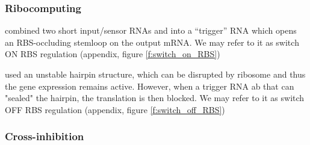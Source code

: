 \documentclass[12pt,notitlepage]{article}
\newcommand{\hh}[1]{{\color{Purple}#1}}
\begin{document}
\subsubsection*{Ribocomputing}

\citet[\href{https://www.nature.com/articles/nature23271/figures/2}{Fig.~2e}]{GreenETAL2017}
combined
two short input/sensor RNAs
 and 
into a ``trigger'' RNA
which opens an RBS-occluding stemloop
on the output mRNA. \hh{We may refer to it as switch ON RBS regulation (appendix, figure \ref{f:switch_on_RBS})}

%
%

\hh{
\citet[\href{https://www.nature.com/articles/s41589-019-0388-1/figures/3}{Fig.~3}]{Kim2019}
used an unstable hairpin structure, which can be disrupted by ribosome and thus the gene expression remains active.
However, when a trigger RNA ab that can "sealed" the hairpin, the translation is then blocked. We may refer to it as switch OFF RBS regulation (appendix, figure \ref{f:switch_off_RBS})
}
%
%
%

\subsubsection*{Cross-inhibition} \label{ss:xinh}
\end{document}
